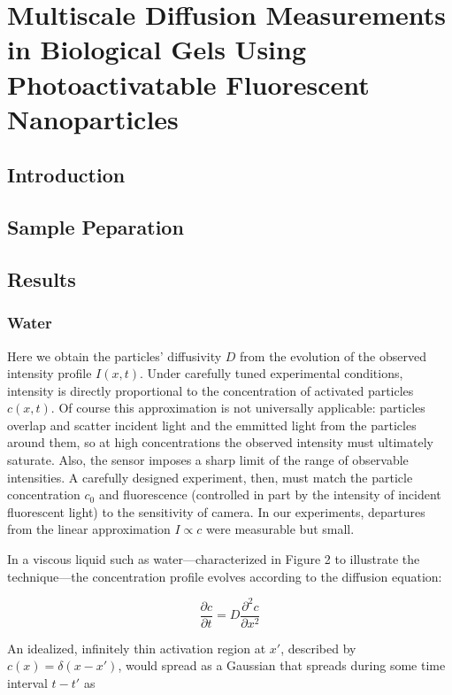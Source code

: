 \chapter{Multiscale Diffusion Measurements in Biological Gels Using Photoactivatable Fluorescent Nanoparticles}

\section{Introduction}
\section{Sample Peparation}
\section{Results}

\subsection{Water}

Here we obtain the particles' diffusivity $D$ from the evolution of the observed intensity profile $I(x, t)$. Under carefully tuned experimental conditions, intensity is directly proportional to the concentration of activated particles $c(x, t)$. Of course this approximation is not universally applicable: particles overlap and scatter incident light and the emmitted light from the particles around them, so at high concentrations the observed intensity must ultimately saturate. Also, the sensor imposes a sharp limit of the range of observable intensities. A carefully designed experiment, then, must match the particle concentration $c_0$ and fluorescence (controlled in part by the intensity of incident fluorescent light) to the sensitivity of camera. In our experiments, departures from the linear approximation $I \propto c$ were measurable but small.

In a viscous liquid such as water---characterized in Figure 2 to illustrate the technique---the concentration profile evolves according to the diffusion equation:

\begin{equation}
 \frac{\partial c}{\partial t} = D\frac{\partial^2 c}{\partial x^2}
\end{equation}

\noindent An idealized, infinitely thin activation region at $x'$, described by $c(x) = \delta(x-x')$, would spread as a Gaussian that spreads during some time interval $t-t'$ as

